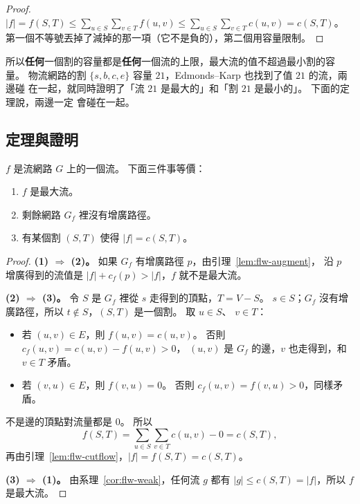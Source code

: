 \begin{proof}
$|f| = f(S, T) \le \sum_{u \in S} \sum_{v \in T} f(u, v) \le \sum_{u \in S} \sum_{v \in T}
c(u, v) = c(S, T)$。 第一個不等號丟掉了減掉的那一項（它不是負的），第二個用容量限制。
\end{proof}

所以\textbf{任何}一個割的容量都是\textbf{任何}一個流的上限，最大流的值不超過最小割的容
量。 物流網路的割 $\{s, b, c, e\}$ 容量 $21$，Edmonds--Karp 也找到了值 $21$ 的流，兩邊碰
在一起，就同時證明了「流 $21$ 是最大的」和「割 $21$ 是最小的」。 下面的定理說，兩邊一定
會碰在一起。

\subsection{定理與證明}

\begin{theorem}[最大流最小割定理]
\label{thm:flw-mfmc}
$f$ 是流網路 $G$ 上的一個流。 下面三件事等價：
\begin{enumerate}
\item $f$ 是最大流。
\item 剩餘網路 $G_f$ 裡沒有增廣路徑。
\item 有某個割 $(S, T)$ 使得 $|f| = c(S, T)$。
\end{enumerate}
\end{theorem}

\begin{proof}
\textbf{(1) $\Rightarrow$ (2)。} 如果 $G_f$ 有增廣路徑 $p$，由引理~\ref{lem:flw-augment}，
沿 $p$ 增廣得到的流值是 $|f| + c_f(p) > |f|$，$f$ 就不是最大流。

\textbf{(2) $\Rightarrow$ (3)。} 令 $S$ 是 $G_f$ 裡從 $s$ 走得到的頂點，$T = V - S$。
$s \in S$；$G_f$ 沒有增廣路徑，所以 $t \notin S$，$(S, T)$ 是一個割。 取 $u \in S$、
$v \in T$：
\begin{itemize}
\item 若 $(u, v) \in E$，則 $f(u, v) = c(u, v)$。 否則 $c_f(u, v) = c(u, v) - f(u, v) > 0$，
$(u, v)$ 是 $G_f$ 的邊，$v$ 也走得到，和 $v \in T$ 矛盾。
\item 若 $(v, u) \in E$，則 $f(v, u) = 0$。 否則 $c_f(u, v) = f(v, u) > 0$，同樣矛盾。
\end{itemize}
不是邊的頂點對流量都是 $0$。 所以
\[
f(S, T) = \sum_{u \in S} \sum_{v \in T} c(u, v) - 0 = c(S, T),
\]
再由引理~\ref{lem:flw-cutflow}，$|f| = f(S, T) = c(S, T)$。

\textbf{(3) $\Rightarrow$ (1)。} 由系理~\ref{cor:flw-weak}，任何流 $g$ 都有
$|g| \le c(S, T) = |f|$，所以 $f$ 是最大流。
\end{proof}

